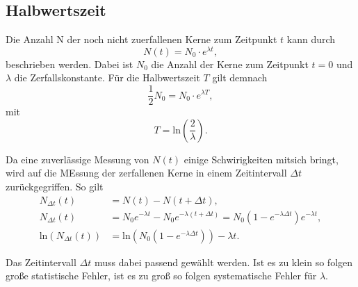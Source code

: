 \subsection{Halbwertszeit}
Die Anzahl N der noch nicht zuerfallenen Kerne zum Zeitpunkt $t$ kann durch
\begin{equation}
    N(t)=N_0\cdot e^{\lambda t},
\end{equation}
beschrieben werden. Dabei ist $N_0$ die Anzahl der Kerne zum Zeitpunkt $t=0$ und $\lambda$ 
die Zerfallskonstante. Für die Halbwertszeit $T$ gilt demnach
\begin{equation}
    \frac{1}{2}N_0=N_0\cdot e^{\lambda T},
\end{equation}
mit
\begin{equation}
    T=\text{ln}\left(\frac{2}{\lambda}\right).
\end{equation}

Da eine zuverlässige Messung von $N(t)$ einige Schwirigkeiten mitsich bringt, wird auf
die MEssung der zerfallenen Kerne in einem Zeitintervall $\Delta t$ zurückgegriffen.
So gilt
\begin{align}
    N_{\Delta t}(t)&=N(t)-N(t+\Delta t),\\
    N_{\Delta t}(t)&=N_0e^{-\lambda t}-N_0e^{-\lambda(t+\Delta t)}=N_0(1-e^{-\lambda\Delta t})e^{-\lambda t},\\
    \text{ln}(N_{\Delta t}(t))&=\text{ln}\left(N_0(1-e^{-\lambda\Delta t})\right)-\lambda t. \label{eqn:Zerfallsgesetz}
\end{align}

Das Zeitintervall $\Delta t$ muss dabei passend gewählt werden. Ist es zu klein
so folgen große statistische Fehler, ist es zu groß so folgen systematische Fehler für $\lambda$.
\label{subsec:halbwertszeit}